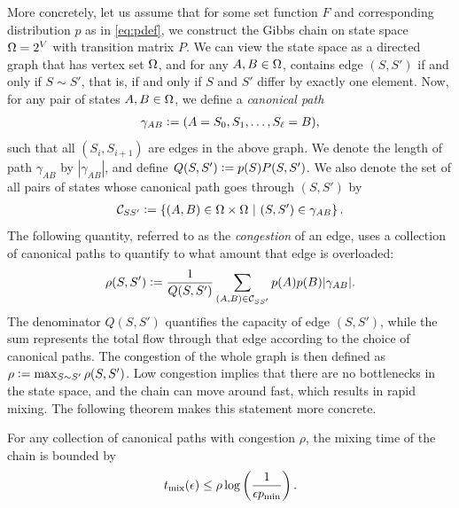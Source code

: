 More concretely, let us assume that for some set function $F$ and corresponding distribution $p$ as in \eqref{eq:pdef}, we construct the Gibbs chain on state space $\ss = 2^V$ with transition matrix $P$.
We can view the state space as a directed graph that has vertex set $\ss$, and for any $A, B \in \ss$, contains edge $(S, S')$ if and only if $S \sim S'$, that is, if and only if $S$ and $S'$ differ by exactly one element.
Now, for any pair of states $A, B \in \ss$, we define a \emph{canonical path}
\begin{align*}
\gamma_{AB} \defeq (A = S_0, S_1, \ldots, S_{\ell} = B),
\end{align*}
such that all $(S_i, S_{i+1})$ are edges in the above graph.
We denote the length of path $\gamma_{AB}$ by $|\gamma_{AB}|$, and define $Q(S, S') \defeq p(S) P(S, S')$.
We also denote the set of all pairs of states whose canonical path goes through $(S, S')$ by
\begin{align*}
\mathcal{C}_{SS'} \defeq \sdef{(A, B) \in \ss \times \ss}{(S, S') \in \gamma_{AB}}.
\end{align*}
The following quantity, referred to as the \emph{congestion} of an edge, uses a collection of canonical paths to quantify to what amount that edge is overloaded:
\begin{align} \label{eq:cong}
  \rho(S, S') \defeq \frac{1}{Q(S, S')} \sum_{(A, B) \in \mathcal{C}_{SS'}} p(A) p(B) |\gamma_{AB}|.
\end{align}
The denominator $Q(S, S')$ quantifies the capacity of edge $(S, S')$, while the sum represents the total flow through that edge according to the choice of canonical paths.
The congestion of the whole graph is then defined as $\rho \defeq \max_{S \sim S'}\rho(S, S')$.
Low congestion implies that there are no bottlenecks in the state space, and the chain can move around fast, which results in rapid mixing.
The following theorem makes this statement more concrete.

\begin{theorem} \label{thm:cpath}
  For any collection of canonical paths with congestion $\rho$, the mixing time of the chain is bounded by
  \begin{align*}
  	\tme \leq \rho \log\left(\frac{1}{\epsilon p_{\mathrm{min}}}\right).
  \end{align*}
\end{theorem}

